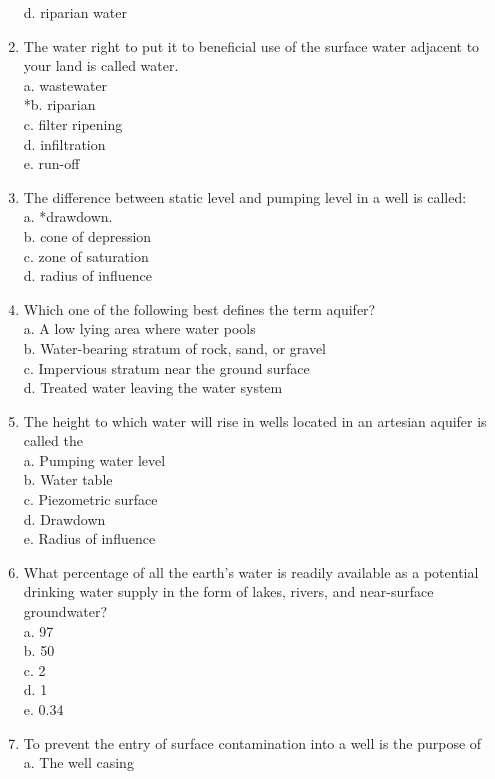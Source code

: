 \begin{enumerate}
d. riparian water\\
\item The water right to put it to beneficial use of the surface water adjacent to your land is called water.\\
a. wastewater\\
*b. riparian\\
c. filter ripening\\
d. infiltration\\
e. run-off\\
\item The difference between static level and pumping level in a well is called:\\
a. *drawdown.\\
b. cone of depression\\
c. zone of saturation\\
d. radius of influence\\
\item Which one of the following best defines the term aquifer?\\
a. A low lying area where water pools\\
b. Water-bearing stratum of rock, sand, or gravel\\
c. Impervious stratum near the ground surface\\
d. Treated water leaving the water system\\
\item The height to which water will rise in wells located in an artesian aquifer is called the\\
a. Pumping water level\\
b. Water table\\
c. Piezometric surface\\
d. Drawdown\\
e. Radius of influence\\
\item What percentage of all the earth's water is readily available as a potential drinking water supply in the form of lakes, rivers, and near-surface groundwater?\\
a. 97\\
b. 50\\
c. 2\\
d. 1\\
e. 0.34\\
\item To prevent the entry of surface contamination into a well is the purpose of\\
a. The well casing\\

\end{enumerate}
